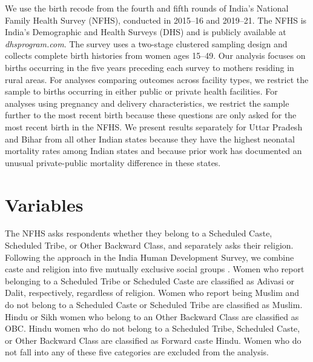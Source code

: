 \documentclass[12pt]{article}
\begin{document}
We use the birth recode from the fourth and fifth rounds of India’s National Family Health Survey (NFHS), conducted in 2015–16 and 2019–21. The NFHS is India’s Demographic and Health Surveys (DHS) and is publicly available at \textit{dhsprogram.com}. The survey uses a two-stage clustered sampling design and collects complete birth histories from women ages 15–49. Our analysis focuses on births occurring in the five years preceding each survey to mothers residing in rural areas. For analyses comparing outcomes across facility types, we restrict the sample to births occurring in either public or private health facilities. For analyses using pregnancy and delivery characteristics, we restrict the sample further to the most recent birth because these questions are only asked for the most recent birth in the NFHS. We present results separately for Uttar Pradesh and Bihar from all other Indian states because they have the highest neonatal mortality rates among Indian states and because prior work has documented an unusual private-public mortality difference in these states.


\section{Variables}

The NFHS asks respondents whether they belong to a Scheduled Caste, Scheduled Tribe, or Other Backward Class, and separately asks their religion. Following the approach in the India Human Development Survey, we combine caste and religion into five mutually exclusive social groups \citep{IHDS2005}. Women who report belonging to a Scheduled Tribe or Scheduled Caste are classified as Adivasi or Dalit, respectively, regardless of religion. Women who report being Muslim and do not belong to a Scheduled Caste or Scheduled Tribe are classified as Muslim. Hindu or Sikh women who belong to an Other Backward Class are classified as OBC. Hindu women who do not belong to a Scheduled Tribe, Scheduled Caste, or Other Backward Class are classified as Forward caste Hindu. Women who do not fall into any of these five categories are excluded from the analysis.
\end{document}
